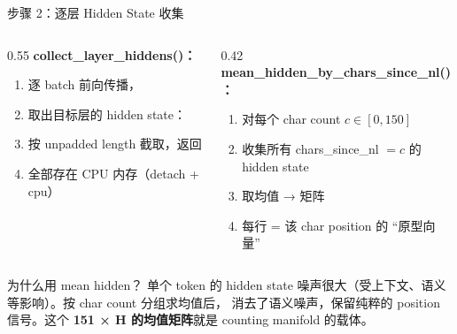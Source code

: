 % 

\begin{frame}{步骤 2：逐层 Hidden State 收集}
\small
\begin{columns}[T,onlytextwidth]
\begin{column}{0.55\linewidth}
\textbf{collect\_layer\_hiddens()：}
\begin{enumerate}
  \item 逐 batch 前向传播，
  \item 取出目标层的 hidden state：
  \item 按 unpadded length 截取，返回 
  \item 全部存在 CPU 内存（detach + cpu）
\end{enumerate}
\end{column}
\begin{column}{0.42\linewidth}
\textbf{mean\_hidden\_by\_chars\_since\_nl()：}
\begin{enumerate}
  \item 对每个 char count $c \in [0, 150]$
  \item 收集所有 chars\_since\_nl $= c$ 的 hidden state
  \item 取均值 → \code{[151, H]} 矩阵
  \item 每行 = 该 char position 的 ``原型向量''
\end{enumerate}
\end{column}
\end{columns}

\vspace{0.4em}
\begin{block}{为什么用 mean hidden？}
单个 token 的 hidden state 噪声很大（受上下文、语义等影响）。按 char count 分组求均值后，
消去了语义噪声，保留纯粹的 position 信号。这个 \textbf{151 × H 的均值矩阵}就是 counting manifold 的载体。
\end{block}
\end{frame}

